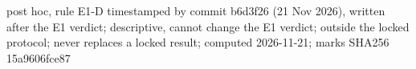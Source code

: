post hoc, rule E1-D timestamped by commit b6d3f26 (21 Nov 2026), written after the E1 verdict; descriptive, cannot change the E1 verdict; outside the locked protocol; never replaces a locked result; computed 2026-11-21; marks SHA256 15a9606fce87
